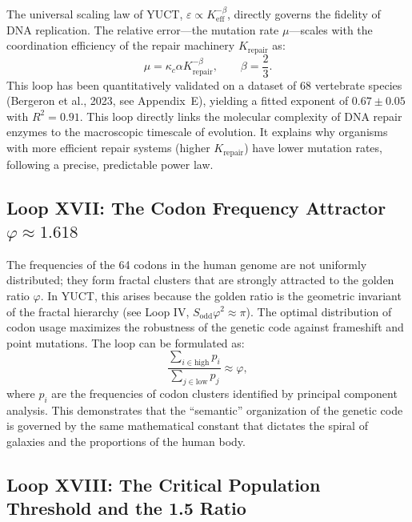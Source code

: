 \documentclass[12pt]{article}
\begin{document}
	The universal scaling law of YUCT, \(\varepsilon \propto K_{\mathrm{eff}}^{-\beta}\), directly governs the fidelity of DNA replication. The relative error—the mutation rate \(\mu\)—scales with the coordination efficiency of the repair machinery \(K_{\mathrm{repair}}\) as:
	\begin{equation}
		\boxed{ \mu = \kappa_c \alpha K_{\mathrm{repair}}^{-\beta}, \qquad \beta = \frac{2}{3} }.
	\end{equation}
	This loop has been quantitatively validated on a dataset of 68 vertebrate species (Bergeron et al., 2023, see Appendix~E), yielding a fitted exponent of \(0.67 \pm 0.05\) with \(R^2 = 0.91\). This loop directly links the molecular complexity of DNA repair enzymes to the macroscopic timescale of evolution. It explains why organisms with more efficient repair systems (higher \(K_{\mathrm{repair}}\)) have lower mutation rates, following a precise, predictable power law.
	
	\subsection{Loop XVII: The Codon Frequency Attractor \(\varphi \approx 1.618\)}
	
	The frequencies of the 64 codons in the human genome are not uniformly distributed; they form fractal clusters that are strongly attracted to the golden ratio \(\varphi\). In YUCT, this arises because the golden ratio is the geometric invariant of the fractal hierarchy (see Loop IV, \(S_{\mathrm{odd}}\varphi^2 \approx \pi\)). The optimal distribution of codon usage maximizes the robustness of the genetic code against frameshift and point mutations. The loop can be formulated as:
	\begin{equation}
		\boxed{ \frac{\sum_{i \in \text{high}} p_i}{\sum_{j \in \text{low}} p_j} \approx \varphi },
	\end{equation}
	where \(p_i\) are the frequencies of codon clusters identified by principal component analysis. This demonstrates that the ``semantic'' organization of the genetic code is governed by the same mathematical constant that dictates the spiral of galaxies and the proportions of the human body.
	
	\subsection{Loop XVIII: The Critical Population Threshold and the 1.5 Ratio}
	
\end{document}
